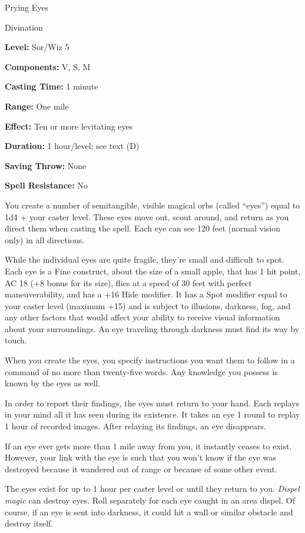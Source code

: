 \documentclass{article}
\begin{document}
\vspace{12pt}
Prying Eyes

Divination

\textbf{Level:} Sor/Wiz 5

\textbf{Components:} V, S, M

\textbf{Casting Time:} 1 minute

\textbf{Range:} One mile

\textbf{Effect:} Ten or more levitating eyes

\textbf{Duration:} 1 hour/level; see text (D)

\textbf{Saving Throw:} None

\textbf{Spell Resistance:} No

You create a number of semitangible, visible magical orbs (called ``eyes'') equal 
to 1d4 + your caster level. These eyes move out, scout around, and return as you 
direct them when casting the spell. Each eye can see 120 feet (normal vision only) 
in all directions.

While the individual eyes are quite fragile, they're small and difficult to spot. 
Each eye is a Fine construct, about the size of a small apple, that has 1 hit point, 
AC 18 (+8 bonus for its size), flies at a speed of 30 feet with perfect maneuverability, 
and has a +16 Hide modifier. It has a Spot modifier equal to your caster level 
(maximum +15) and is subject to illusions, darkness, fog, and any other factors 
that would affect your ability to receive visual information about your surroundings. 
An eye traveling through darkness must find its way by touch.

When you create the eyes, you specify instructions you want them to follow in a 
command of no more than twenty-five words. Any knowledge you possess is known by 
the eyes as well.

In order to report their findings, the eyes must return to your hand. Each replays 
in your mind all it has seen during its existence. It takes an eye 1 round to replay 
1 hour of recorded images. After relaying its findings, an eye disappears. 

If an eye ever gets more than 1 mile away from you, it instantly ceases to exist. 
However, your link with the eye is such that you won't know if the eye was destroyed 
because it wandered out of range or because of some other event.

The eyes exist for up to 1 hour per caster level or until they return to you. \textit{Dispel 
magic }can destroy eyes. Roll separately for each eye caught in an area dispel. 
Of course, if an eye is sent into darkness, it could hit a wall or similar obstacle 
and destroy itself.
\end{document}
